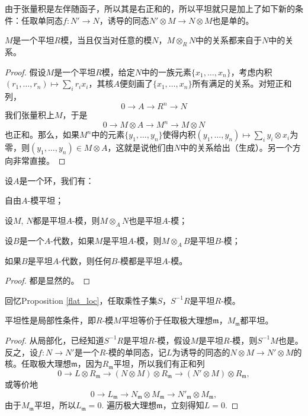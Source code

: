 由于张量积是左伴随函子，所以其是右正和的，所以平坦就只是加上了如下新的条件：任取单同态$f:N'\to N$，诱导的同态$N'\otimes M \to N\otimes M$也是单的。

\begin{pro}[利用关系刻画平坦性]
	$M$是一个平坦$R$模，当且仅当对任意的模$N$，$M\otimes_R N$中的关系都来自于$N$中的关系。
\end{pro}

\begin{proof}
假设$M$是一个平坦$R$模，给定$N$中的一族元素$\{x_1,\dots,x_n\}$，考虑内积$(r_1,\dots,r_n)\mapsto \sum_i r_i x_i$，其核$A$便刻画了$\{x_1,\dots,x_n\}$所有满足的关系。对短正和列，
\[
	0\to A\to R^n\to N
\]
我们张量积上$M$，于是
\[
	0\to M\otimes A\to M^n\to M\otimes N
\]
也正和。那么，如果$M^n$中的元素$\{y_1,\dots,y_n\}$使得内积$(y_1,\dots,y_n)\mapsto \sum_i y_i \otimes x_i$为零，则$(y_1,\dots,y_n)\in M\otimes A$，这就是说他们由$N$中的关系给出（生成）。另一个方向非常直接。
\end{proof}

\begin{pro}
	设$A$是一个环，我们有：
	\begin{compactenum}
		\item 自由$A$-模平坦；
		\item 设$M$, $N$都是平坦$A$-模，则$M\otimes_A N$也是平坦$A$-模；
		\item 设$B$是一个$A$-代数，如果$M$是平坦$A$-模，则$M\otimes_A B$是平坦$B$-模； 
		\item 如果$B$是平坦$A$-代数，则任何$B$-模都是平坦$A$-模。
	\end{compactenum}
\end{pro}

\begin{proof}
	都是显然的。
\end{proof}

回忆Proposition \ref{flat_loc}，任取乘性子集$S$，$S^{-1}R$是平坦$R$-模。

\begin{pro}
	平坦性是局部性条件，即$R$-模$M$平坦等价于任取极大理想$\mathfrak m$，$M_{\mathfrak m}$都平坦。
\end{pro}

\begin{proof}
	从局部化，已经知道$S^{-1}R$是平坦$R$-模，假设$M$是平坦$R$-模，则$S^{-1}M$也是。反之，设$f:N\to N'$是一个$R$-模的单同态，记$L$为诱导的同态的$N\otimes M\to N'\otimes M$的核。任取极大理想$\mathfrak m$，因为$R_{\mathfrak m}$平坦，所以我们有正和列
	\[
		0\to L\otimes R_{\mathfrak m}\to (N\otimes M)\otimes R_{\mathfrak m}\to (N'\otimes M)\otimes R_{\mathfrak m},
	\]
	或等价地
	\[
		0\to L_{\mathfrak m}\to N_{\mathfrak m}\otimes M_{\mathfrak m}\to N'_{\mathfrak m}\otimes M_{\mathfrak m},
	\]
	由于$M_{\mathfrak m}$平坦，所以$L_{\mathfrak m}=0$. 遍历极大理想$\mathfrak m$，立刻得知$L=0$.
\end{proof}

